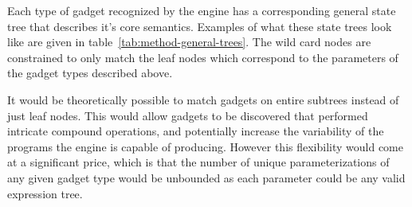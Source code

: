     Each type of gadget recognized by the engine has a corresponding general
    state tree that describes it's core semantics. Examples of what these state
    trees look like are given in table~\ref{tab:method-general-trees}. The wild
    card nodes are constrained to only match the leaf nodes which correspond to
    the parameters of the gadget types described above.

    It would be theoretically possible to match gadgets on entire subtrees
    instead of just leaf nodes. This would allow gadgets to be discovered that
    performed intricate compound operations, and potentially increase the
    variability of the programs the engine is capable of producing. However this
    flexibility would come at a significant price, which is that the number of
    unique parameterizations of any given gadget type would be unbounded as each
    parameter could be any valid expression tree.

